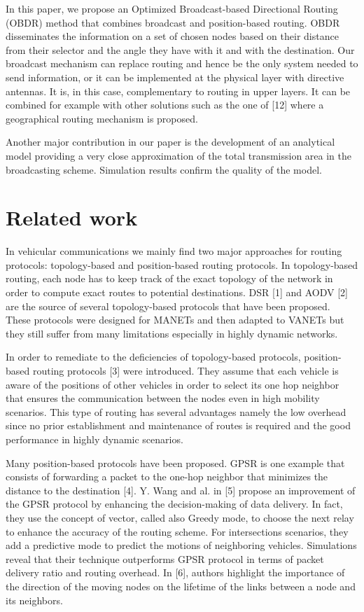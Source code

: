 \documentclass{IEEEtran}
\begin{document}
In this paper, we propose an Optimized Broadcast-based Directional
Routing (OBDR) method that combines broadcast and position-based
routing. OBDR disseminates the information on a set of chosen nodes
based on their distance from their selector and the angle they have
with it and with the destination. Our broadcast mechanism can
replace routing and hence be the only system needed to send
information, or it can be implemented at the physical layer with
directive antennas. It is, in this case, complementary to routing in
upper layers. It can be combined for example with other solutions
such as the one of [12] where a geographical routing mechanism is
proposed.

Another major contribution in our paper is the development of an
analytical model providing a very close approximation of the total
transmission area in the broadcasting scheme. Simulation results
confirm the quality of the model.



\section{Related work}\label{stateArt:sec}

In vehicular communications we mainly find two major approaches for
routing protocols: topology-based and position-based routing
protocols. In topology-based routing, each node has to keep track of
the exact topology of the network in order to compute exact routes
to potential destinations. DSR [1] and AODV [2] are the source of
several topology-based protocols that have been proposed. These
protocols were designed for MANETs and then adapted to VANETs but
they still suffer from many limitations especially in highly dynamic
networks.

In order to remediate to the deficiencies of topology-based
protocols, position-based routing protocols [3] were introduced.
They assume that each vehicle is aware of the positions of other
vehicles in order to select its one hop neighbor that ensures the
communication between the nodes even in high mobility scenarios.
This type of routing has several advantages namely the low overhead
since no prior establishment and maintenance of routes is required
and the good performance in highly dynamic scenarios.

Many position-based protocols have been proposed. GPSR is one
example that consists of forwarding a packet to the one-hop neighbor
that minimizes the distance to the destination [4]. Y. Wang and al.
in [5] propose an improvement of the GPSR protocol by enhancing the
decision-making of data delivery. In fact, they use the concept of
vector, called also Greedy mode, to choose the next relay to enhance
the accuracy of the routing scheme. For intersections scenarios,
they add a predictive mode to predict the motions of neighboring
vehicles. Simulations reveal that their technique outperforms GPSR
protocol in terms of packet delivery ratio and routing overhead.
In [6], authors highlight the importance of the direction of the
moving nodes on the lifetime of the links between a node and its
neighbors.
\end{document}
